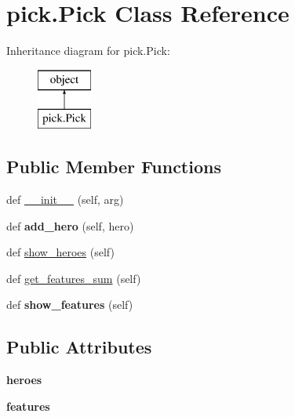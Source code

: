 \hypertarget{classpick_1_1_pick}{}\section{pick.\+Pick Class Reference}
\label{classpick_1_1_pick}
Inheritance diagram for pick.\+Pick\+:\begin{figure}[H]
\begin{center}
\leavevmode
\includegraphics[height=2.000000cm]{classpick_1_1_pick}
\end{center}
\end{figure}
\subsection*{Public Member Functions}
\begin{DoxyCompactItemize}
\item 
def \hyperlink{classpick_1_1_pick_ab5dfdc4884d79ca0d9c8bdc9087d13e0}{\+\_\+\+\_\+init\+\_\+\+\_\+} (self, arg)
\item 
def {\bfseries add\+\_\+hero} (self, hero)\hypertarget{classpick_1_1_pick_a3924e68fa65169363b187cf9da662833}{}\label{classpick_1_1_pick_a3924e68fa65169363b187cf9da662833}

\item 
def \hyperlink{classpick_1_1_pick_aca17179c68e00a8ff3f6fff44a78c273}{show\+\_\+heroes} (self)
\item 
def \hyperlink{classpick_1_1_pick_aed47b3e5a260b2620c0f6b7a28f81680}{get\+\_\+features\+\_\+sum} (self)
\item 
def {\bfseries show\+\_\+features} (self)\hypertarget{classpick_1_1_pick_ade057b1384dc1df25fc68a5fe2e8b2f8}{}\label{classpick_1_1_pick_ade057b1384dc1df25fc68a5fe2e8b2f8}

\end{DoxyCompactItemize}
\subsection*{Public Attributes}
\begin{DoxyCompactItemize}
\item 
{\bfseries heroes}\hypertarget{classpick_1_1_pick_aebc6188a9c8bc4852a747d073af68a4a}{}\label{classpick_1_1_pick_aebc6188a9c8bc4852a747d073af68a4a}

\item 
{\bfseries features}\hypertarget{classpick_1_1_pick_ad8ca33d7e3d1b4ea525653254f1232b8}{}\label{classpick_1_1_pick_ad8ca33d7e3d1b4ea525653254f1232b8}

\end{DoxyCompactItemize}


